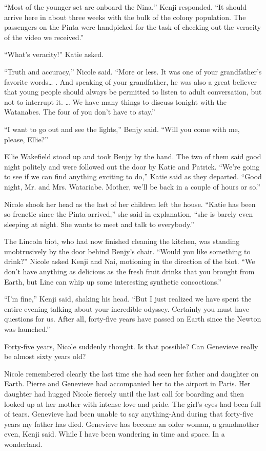 \documentclass[]{article}
\begin{document}
{“Most of the younger set are onboard the Nina,” Kenji responded. “It should arrive here in about three weeks with the bulk of the colony population. The passengers on the Pinta were handpicked for the task of checking out the veracity of the video we received.”

“What’s veracity!” Katie asked.

“Truth and accuracy,” Nicole said. “More or less. It was one of your grandfather’s favorite words… . And speaking of your grandfather, he was also a great believer that young people should always be permitted to listen to adult conversation, but not to interrupt it. … We have many things to discuss tonight with the Watanabes. The four of you don’t have to stay.”

“I want to go out and see the lights,” Benjy said. “Will you come with me, please, Ellie?”

Ellie Wakefield stood up and took Benjy by the hand. The two of them said good night politely and were followed out the door by Katie and Patrick. “We’re going to see if we can find anything exciting to do,” Katie said as they departed. “Good night, Mr. and Mrs. Watariabe. Mother, we’ll be back in a couple of hours or so.”

Nicole shook her head as the last of her children left the house. “Katie has been so frenetic since the Pinta arrived,” she said in explanation, “she is barely even sleeping at night. She wants to meet and talk to everybody.”

The Lincoln biot, who had now finished cleaning the kitchen, was standing unobtrusively by the door behind Benjy’s chair. “Would you like something to drink?” Nicole asked Kenji and Nai, motioning in the direction of the biot. “We don’t have anything as delicious as the fresh fruit drinks that you brought from Earth, but Line can whip up some interesting synthetic concoctions.”

“I’m fine,” Kenji said, shaking his head. “But I just realized we have spent the entire evening talking about your incredible odyssey. Certainly you must have questions for us. After all, forty-five years have passed on Earth since the Newton was launched.”

Forty-five years, Nicole suddenly thought. Is that possible? Can Genevieve really be almost sixty years old?

Nicole remembered clearly the last time she had seen her father and daughter on Earth. Pierre and Genevieve had accompanied her to the airport in Paris. Her daughter had hugged Nicole fiercely until the last call for boarding and then looked up at her mother with intense love and pride. The girl’s eyes had been full of tears. Genevieve had been unable to say anything-And during that forty-five years my father has died. Genevieve has become an older woman, a grandmother even, Kenji said. While I have been wandering in time and space. In a wonderland.

}
\end{document}
